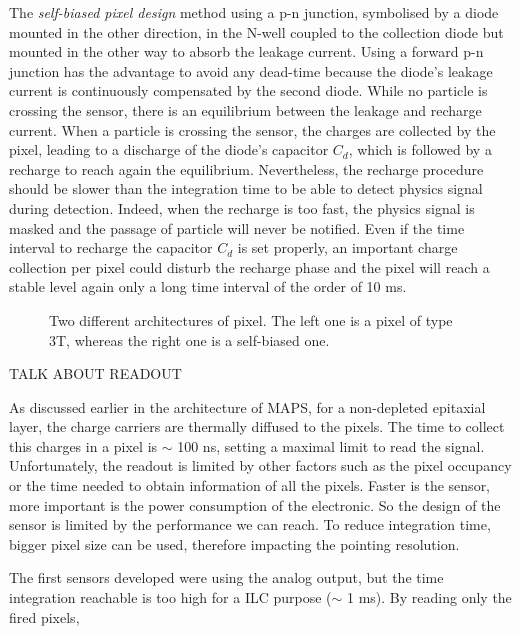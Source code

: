     The \textit{self-biased pixel design} method using a p-n junction, symbolised by a diode mounted in the other direction, in the N-well coupled to the collection diode but mounted in the other way to absorb the leakage current.
    Using a forward p-n junction has the advantage to avoid any dead-time because the diode's leakage current is continuously compensated by the second diode.
    While no particle is crossing the sensor, there is an equilibrium between the leakage and recharge current.
    When a particle is crossing the sensor, the charges are collected by the pixel, leading to a discharge of the diode's capacitor $C_d$, which is followed by a recharge to reach again the equilibrium.
    Nevertheless, the recharge procedure should be slower than the integration time to be able to detect physics signal during detection.
    Indeed, when the recharge is too fast, the physics signal is masked and the passage of particle will never be notified.
    Even if the time interval to recharge the capacitor $C_d$ is set properly, an important charge collection per pixel could disturb the recharge phase and the pixel will reach a stable level again only a long time interval of the order of 10 ms.

    \begin{figure}[!h]
      \label{fig:elecArch}
      \caption{Two different architectures of pixel. The left one is a pixel of type 3T, whereas the right one is a self-biased one.}
    \end{figure}

    TALK ABOUT READOUT
    
    As discussed earlier in the architecture of \gls{MAPS}, for a non-depleted epitaxial layer, the charge carriers are thermally diffused to the pixels.
    The time to collect this charges in a pixel is $\sim$ 100 ns, setting a maximal limit to read the signal.
    Unfortunately, the readout is limited by other factors such as the pixel occupancy or the time needed to obtain information of all the pixels.
    Faster is the sensor, more important is the power consumption of the electronic.
    So the design of the sensor is limited by the performance we can reach. 
    To reduce integration time, bigger pixel size can be used, therefore impacting the pointing resolution.

    The first sensors developed were using the analog output, but the time integration reachable is too high for a \gls{ILC} purpose ($\sim$ 1 ms).
    By reading only the fired pixels, 

